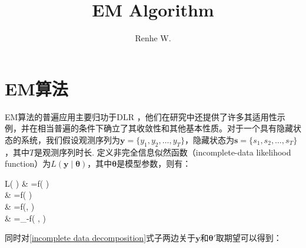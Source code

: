 \documentclass[UTF8,12pt]{ctexart}
\title{EM Algorithm}
\author{Renhe W.}
\date{ }
\numberwithin{equation}{section}%
\begin{document}
		
	\maketitle
	\tableofcontents%
	\listoffigures%
	\listoftables%
	\newpage
	\kaishu
	
	
		
	\section{EM算法}
	EM算法的普遍应用主要归功于DLR \citep{dempster1977maximum}，他们在研究中还提供了许多其适用性示例，并在相当普遍的条件下确立了其收敛性和其他基本性质。对于一个具有隐藏状态的系统，我们假设观测序列为$\mathbf{y}=\{y_1,y_2,\dots,y_T\}$，隐藏状态为$\mathbf{s}=\{s_1,s_2,\dots,s_T\}$，其中$T$是观测序列时长. 定义非完全信息似然函数（incomplete-data likelihood function）为$L(\mathbf{y}\mid \mathbf{\theta})$，其中$\boldsymbol{\theta}$是模型参数，则有：
	\begin{DispWithArrows}[tikz=blue,tagged-lines=last]
		\log L( \mid \boldsymbol{\theta}) & =\log f( \mid \boldsymbol{\theta}) \\
		& =\log f( \mid \boldsymbol{\theta}) \cdot {} \\
		& =\log  f(,  \mid \boldsymbol{\theta})\cdot {} \\
		& =\log{}_{}-\log f( \mid {}, \theta)\label{incomplete data decomposition}
	\end{DispWithArrows}
	同时对\eqref{incomplete data decomposition}式子两边关于$\mathbf{y}$和$\boldsymbol{\theta}'$取期望可以得到：
\end{document}

